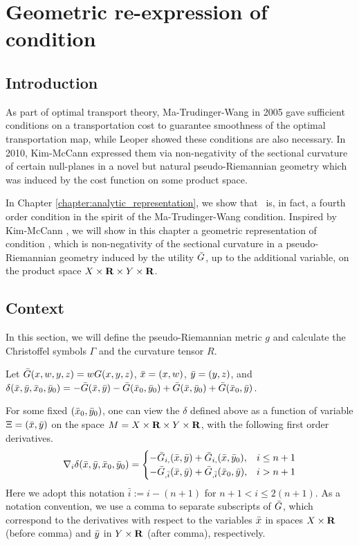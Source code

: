 \chapter{Geometric re-expression of condition \Gthree}\label{chapter:geometry}

\section{Introduction}

As part of optimal transport theory, Ma-Trudinger-Wang \cite{MaTrudingerWang05} in 2005 gave sufficient conditions on a transportation cost to guarantee smoothness of the optimal transportation map, while Leoper \cite{Loeper09} showed these conditions are also necessary. In 2010, Kim-McCann \cite{KimMcCann10} expressed them via non-negativity of the sectional curvature of certain null-planes in a novel but natural pseudo-Riemannian geometry which was induced by the cost function on some product space.\medskip

In Chapter \ref{chapter:analytic_representation}, we show that \Gthree~is, in fact, a fourth order condition in the spirit of the Ma-Trudinger-Wang condition. Inspired by Kim-McCann \cite{KimMcCann10}, we will show in this chapter a geometric representation of condition \Gthree, which is non-negativity of the sectional curvature in a pseudo-Riemannian geometry induced by the utility $\bar{G}$, up to the additional variable, on the product space $X\times {\mathbf R} \times Y \times {\mathbf R}$.\medskip

\section{Context}\label{section:geometric_setting}

In this section, we will define the pseudo-Riemannian metric $g$ and calculate the Christoffel symbols $\Gamma$ and the curvature tensor $R$. \medskip

Let $\bar{G} (x,w, y,z) = w G(x,y,z)$, $\bar{x} = (x,w)$, $\bar{y} = (y,z)$, and $\delta(\bar{x}, \bar{y}, \bar{x}_{0}, \bar{y}_{0}) = -\bar{G} (\bar{x}, \bar{y}) -\bar{G}(\bar{x}_0, \bar{y}_0) +\bar{G}(\bar{x}, \bar{y}_0) + \bar{G}(\bar{x}_0, \bar{y})$.\medskip

For some fixed $(\bar{x}_0, \bar{y}_0)$, one can view the $\delta$ defined above as a function of variable $\Xi =(\bar{x}, \bar{y})$ on the space $M = X \times {\mathbf R} \times Y \times {\mathbf R}$, with the following first order derivatives.
\begin{equation}
	\nabla_i \delta (\bar{x}, \bar{y}, \bar{x}_0, \bar{y}_0) = \begin{cases}
	-\bar{G}_{i,}(\bar{x}, \bar{y}) + \bar{G}_{i,}(\bar{x}, \bar{y}_0) , & i\le n+1\\
	-\bar{G}_{,\bar{i}}(\bar{x}, \bar{y}) + \bar{G}_{,\bar{i}}(\bar{x}_0, \bar{y}), & i> n+1 \\
	\end{cases}
\end{equation}
Here we adopt this notation $\bar{i}:= i-(n+1)$ for $n+1 <i\le 2(n+1)$. As a notation convention, we use a comma to separate subscripts of $\bar{G}$, which correspond to the derivatives with respect to the variables $\bar{x}$ in spaces $X \times {\mathbf R}$ (before comma) and $\bar{y}$ in $Y \times {\mathbf R}$ (after comma), respectively.\medskip

